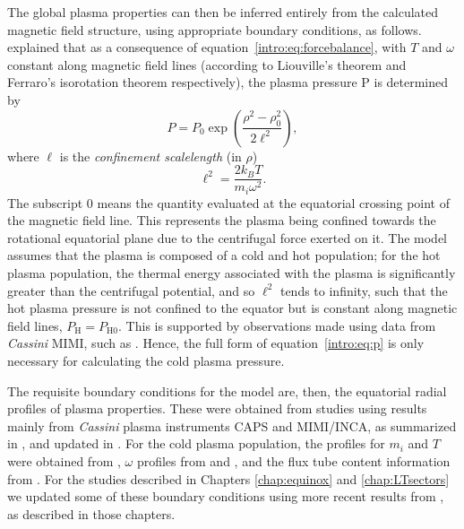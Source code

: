 The global plasma properties can then be inferred entirely from the calculated magnetic field structure, using appropriate boundary conditions, as follows. \citet{caudal1986} explained that as a consequence of equation~\ref{intro:eq:forcebalance}, with $T$ and $\omega$ constant along magnetic field lines (according to Liouville's theorem and Ferraro's isorotation theorem respectively), the plasma pressure P is determined by 
\begin{equation}\label{intro:eq:p}
P = P_{0}\exp\left(\frac{\rho^2-\rho_0^2}{2\ell^2}\right),
\end{equation}
where $\ell$ is the \textit{confinement scalelength} (in $\rho$)
\begin{equation}
\ell^2 = \frac{2k_BT}{m_i\omega^2}.
\end{equation}
The subscript 0 means the quantity evaluated at the equatorial crossing point of the magnetic field line. This represents the plasma being confined towards the rotational equatorial plane due to the centrifugal force exerted on it. The model assumes that the plasma is composed of a cold and hot population; for the hot plasma population, the thermal energy associated with the plasma is significantly greater than the centrifugal potential, and so $\ell^2$ tends to infinity, such that the hot plasma pressure is not confined to the equator but is constant along magnetic field lines, $P_\mathrm{H} = P_\mathrm{H0}$. This is supported by observations made using data from \textit{Cassini} MIMI, such as \citet{krimigis2007}. Hence, the full form of equation~\ref{intro:eq:p} is only necessary for calculating the cold plasma pressure.

The requisite boundary conditions for the model are, then, the equatorial radial profiles of plasma properties. These were obtained from studies using results mainly from \textit{Cassini} plasma instruments CAPS and MIMI/INCA, as summarized in \citet{achilleos2010a}, and updated in \citet{achilleos2010b}. For the cold plasma population, the profiles for $m_i$ and $T$ were obtained from \citet{wilson2008}, $\omega$ profiles from \citet{wilson2008} and \citet{kane2008}, and the flux tube content information from \citet{mcandrews2009}. For the studies described in Chapters \ref{chap:equinox} and \ref{chap:LTsectors} we updated some of these boundary conditions using more recent results from \citet{wilson2017}, as described in those chapters.

